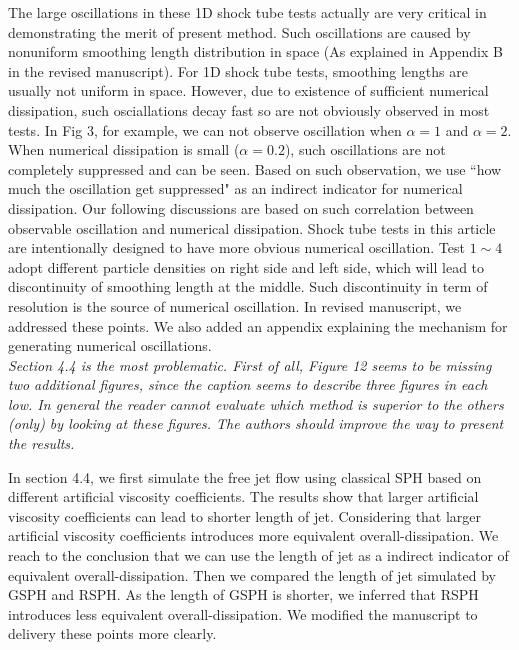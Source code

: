 \documentclass[10pt,a4paper]{article}
\begin{document}
The large oscillations in these 1D shock tube tests actually are very critical in demonstrating the merit of present method. Such oscillations are caused by nonuniform smoothing length distribution in space (As explained in Appendix B in the revised manuscript). For 1D shock tube tests, smoothing lengths are usually not uniform in space. However, due to existence of sufficient numerical dissipation, such osciallations decay fast so are not obviously observed in most tests. In Fig 3, for example, we can not observe oscillation when $\alpha =1$ and $\alpha = 2$. When numerical dissipation is small ($\alpha = 0.2$), such oscillations are not completely suppressed and can be seen. Based on such observation, we use ``how much the oscillation get suppressed" as an indirect indicator for numerical dissipation. Our following discussions are based on such correlation between observable oscillation and numerical dissipation. Shock tube tests in this article are intentionally designed to have more obvious numerical oscillation. Test $1 \sim 4$ adopt different particle densities on right side and left side, which will lead to discontinuity of smoothing length at the middle. Such discontinuity in term of resolution is the source of numerical oscillation. In revised manuscript, we addressed these points. We also added an appendix explaining the mechanism for generating numerical oscillations.
\\[3pt]

\textit{Section 4.4 is the most problematic. First of all, Figure 12 seems to be missing two additional figures, since the caption seems to describe three figures in each low. In general the reader cannot evaluate which method is superior to the others (only) by looking at these figures. The authors should improve the way to present the results.} 

In section 4.4, we first simulate the free jet flow using classical SPH based on different artificial viscosity coefficients. The results show that larger artificial viscosity coefficients can lead to shorter length of jet. Considering that larger artificial viscosity coefficients introduces more equivalent overall-dissipation. We reach to the conclusion that we can use the length of jet as a indirect indicator of equivalent overall-dissipation. 
Then we compared the length of jet simulated by GSPH and RSPH. As the length of GSPH is shorter, we inferred that RSPH introduces less equivalent overall-dissipation.
We modified the manuscript to delivery these points more clearly.
 
\end{document}
